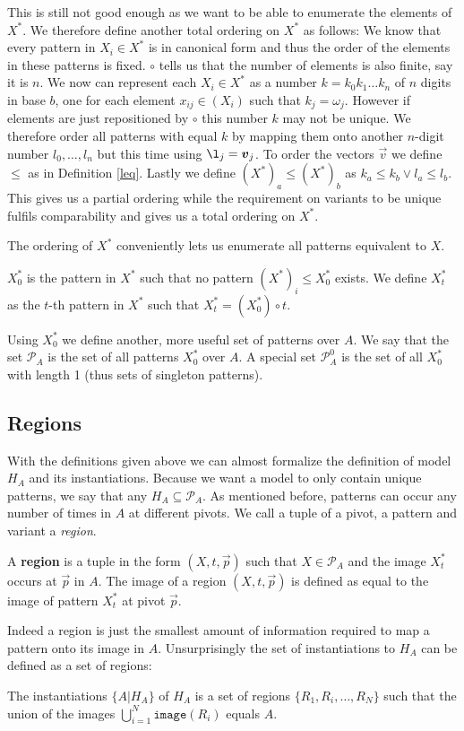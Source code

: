 \documentclass{llncs}
\begin{document}
This is still not good enough as we want to be able to enumerate the elements of $X^*$. We therefore define another total ordering on $X^*$ as follows: We know that every pattern in $X_i\in X^*$ is in canonical form and thus the order of the elements in these patterns is fixed. $\circ$ tells us that the number of elements is also finite, say it is $n$. We now can represent each $X_i\in X^*$ as a number $k=k_0k_1\dots k_n$ of $n$ digits in base $b$, one for each element $x_{ij}\in (X_i)$ such that $k_j=\omega_j$. However if elements are just repositioned by $\circ$ this number $k$ may not be unique. We therefore order all patterns with equal $k$ by mapping them onto another $n$-digit number $l_0,\dots,l_n$ but this time using $\l_j=\vec{v}_j$. To order the vectors $\vec{v}$ we define $\leq$ as in Definition \ref{leq}. Lastly we define $(X^*)_a\leq (X^*)_b$ as $k_a \leq k_b \lor l_a \leq l_b$. This gives us a partial ordering while the requirement on variants to be unique fulfils comparability and gives us a total ordering on $X^*$.

The ordering of $X^*$ conveniently lets us enumerate all patterns equivalent to $X$. 
\begin{definition}
$X^*_0$ is the pattern in $X^*$ such that no pattern $(X^*)_i \leq X^*_0$ exists. We define $X^*_t$ as the $t$-th pattern in $X^*$ such that $X^*_t=(X^*_0)\circ t$.
\end{definition}

Using $X^*_0$ we define another, more useful set of patterns over $A$. We say that the set $\mathcal{P}_A$ is the set of all patterns $X^*_0$ over $A$. A special set $\mathcal{P}_A^0$ is the set of all $X^*_0$ with length 1 (thus sets of singleton patterns).

\subsection{Regions}

With the definitions given above we can almost formalize the definition of model $H_A$ and its instantiations. Because we want a model to only contain unique patterns, we say that any $H_A \subseteq \mathcal{P}_A$. As mentioned before, patterns can occur any number of times in $A$ at different pivots. We call a tuple of a pivot, a pattern and variant a \emph{region}. 
\begin{definition}
A \textbf{region} is a tuple in the form $(X,t,\vec{p})$ such that $X\in \mathcal{P}_A$ and the image $X^*_t$ occurs at $\vec{p}$ in $A$. The image of a region $(X,t,\vec{p})$ is defined as equal to the image of pattern $X^*_t$ at pivot $\vec{p}$.
\end{definition}
Indeed a region is just the smallest amount of information required to map a pattern onto its image in $A$. Unsurprisingly the set of instantiations to $H_A$ can be defined as a set of regions:
\begin{definition}
The instantiations $\{A|H_A\}$ of $H_A$ is a set of regions $\{R_1,R_i,\dots,R_N\}$ such that the union of the images $\displaystyle\bigcup_{i=1}^{N} \mathtt{image}(R_i)$ equals $A$.
\end{definition}
\end{document}

